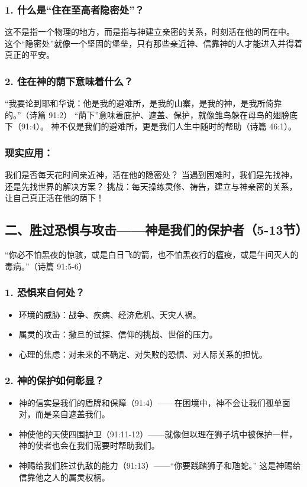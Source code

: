 \documentclass[a4paper, 12pt]{article}
\begin{document}
\subsubsection*{1. 什么是“住在至高者隐密处”？}
这不是指一个物理的地方，而是指与神建立亲密的关系，时刻活在他的同在中。
这个“隐密处”就像一个坚固的堡垒，只有那些亲近神、信靠神的人才能进入并得着真正的平安。
\subsubsection*{2. 住在神的荫下意味着什么？}
“我要论到耶和华说：他是我的避难所，是我的山寨，是我的神，是我所倚靠的。”（诗篇 91:2）
“荫下”意味着庇护、遮盖、保护，就像雏鸟躲在母鸟的翅膀底下（91:4）。
神不仅是我们的避难所，更是我们人生中随时的帮助（诗篇 46:1）。
\subsubsection*{现实应用：}

我们是否每天花时间亲近神，活在他的隐密处？
当遇到困难时，我们是先找神，还是先找世界的解决方案？
挑战：每天操练灵修、祷告，建立与神亲密的关系，让自己真正活在他的荫下！

\subsection*{二、胜过恐惧与攻击——神是我们的保护者（5-13节）}
“你必不怕黑夜的惊骇，或是白日飞的箭，也不怕黑夜行的瘟疫，或是午间灭人的毒病。”（诗篇 91:5-6）

\subsubsection*{1. 恐惧来自何处？}
\begin{itemize}
    \item 环境的威胁：战争、疾病、经济危机、天灾人祸。

    \item 属灵的攻击：撒旦的试探、信仰的挑战、世俗的压力。

    \item 心理的焦虑：对未来的不确定、对失败的恐惧、对人际关系的担忧。

\end{itemize}


\subsubsection*{2. 神的保护如何彰显？}
\begin{itemize}
    \item 神的信实是我们的盾牌和保障（91:4）——在困境中，神不会让我们孤单面对，而是亲自遮盖我们。

    \item 神使他的天使四围护卫（91:11-12）——就像但以理在狮子坑中被保护一样，神的使者也会在我们需要时帮助我们。

    \item 神赐给我们胜过仇敌的能力（91:13）——“你要践踏狮子和虺蛇。” 这是神赐给信靠他之人的属灵权柄。

\end{itemize}
\end{document}
